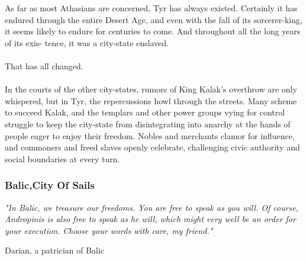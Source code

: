 \begin{multicols}{2}
As far as most Athasians are concerned, Tyr has
always existed. Certainly it has endured through
the entire Desert Age, and even with the fall of its
sorcerer-king, it seems likely to endure for centuries
to come. And throughout all the long years of its exis-
tence, it was a city-state enslaved.\\
\\
That has all changed.\\
\\
In the courts of the other city-states, rumors of
King Kalak’s overthrow are only whispered, but in
Tyr, the repercussions howl through the streets. Many
scheme to succeed Kalak, and the templars and other
power groups vying for control struggle to keep the
city-state from disintegrating into anarchy at the
hands of people eager to enjoy their freedom. Nobles
and merchants clamor for influence, and commoners
and freed slaves openly celebrate, challenging civic
authority and social boundaries at every turn.\\

\subsubsection{Balic,City Of Sails}
\epigraph{\textit{
"In Balic, we treasure our freedoms. You are free to speak
as you will. Of course, Andropinis is also free to speak as he
will, which might very well be an order for your execution.
Choose your words with care, my friend."} }
{ Darian, a patrician of Balic }


\end{multicols}
